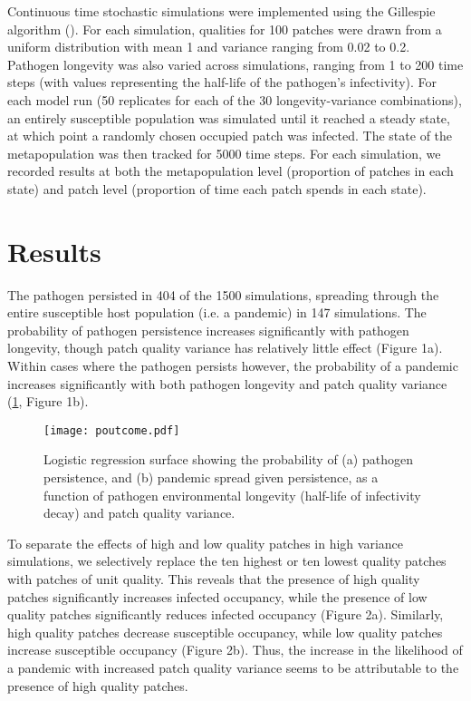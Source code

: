 \documentclass{svjour3}
\begin{document}
Continuous time stochastic simulations were implemented using the Gillespie algorithm (\cite{Gillespie1977}).  For each simulation, qualities for 100 patches were drawn from a uniform distribution with mean 1 and variance ranging from 0.02 to 0.2.  Pathogen longevity was also varied across simulations, ranging from 1 to 200 time steps (with values representing the half-life of the pathogen's infectivity).  For each model run (50 replicates for each of the 30 longevity-variance combinations), an entirely susceptible population was simulated until it reached a steady state, at which point a randomly chosen occupied patch was infected.  The state of the metapopulation was then tracked for 5000 time steps.  For each simulation, we recorded results at both the metapopulation level (proportion of patches in each state) and patch level (proportion of time each patch spends in each state).

\section{Results}
\label{results}

The pathogen persisted in 404 of the 1500 simulations, spreading through the entire susceptible host population (i.e. a pandemic) in 147 simulations.  The probability of pathogen persistence increases significantly with pathogen longevity, though patch quality variance has relatively little effect (Figure 1a).  Within cases where the pathogen persists however, the probability of a pandemic increases significantly with both pathogen longevity and patch quality variance (\ref{poutcome}, Figure 1b).

\begin{figure}
\label{poutcome}
\centering
\texttt{[image: poutcome.pdf]}
\caption{Logistic regression surface showing the probability of (a) pathogen persistence, and (b) pandemic spread given persistence, as a function of pathogen environmental longevity (half-life of infectivity decay) and patch quality variance.}
\end{figure}   

To separate the effects of high and low quality patches in high variance simulations, we selectively replace the ten highest or ten lowest quality patches with patches of unit quality. This reveals that the presence of high quality patches significantly increases infected occupancy, while the presence of low quality patches significantly reduces infected occupancy (Figure 2a).  Similarly, high quality patches decrease susceptible occupancy, while low quality patches increase susceptible occupancy (Figure 2b).  Thus, the increase in the likelihood of a pandemic with increased patch quality variance seems to be attributable to the presence of high quality patches.
\end{document}
